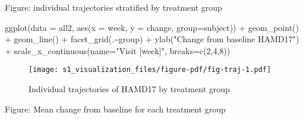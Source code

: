 \documentclass[
  letterpaper,
  DIV=11,
  numbers=noendperiod]{scrreprt}
\newenvironment{Shaded}{\begin{snugshade}}{\end{snugshade}}
\newcommand{\AttributeTok}[1]{\textcolor[rgb]{0.40,0.45,0.13}{#1}}
\newcommand{\DecValTok}[1]{\textcolor[rgb]{0.68,0.00,0.00}{#1}}
\newcommand{\FunctionTok}[1]{\textcolor[rgb]{0.28,0.35,0.67}{#1}}
\newcommand{\NormalTok}[1]{\textcolor[rgb]{0.00,0.23,0.31}{#1}}
\newcommand{\SpecialCharTok}[1]{\textcolor[rgb]{0.37,0.37,0.37}{#1}}
\newcommand{\StringTok}[1]{\textcolor[rgb]{0.13,0.47,0.30}{#1}}
\begin{document}
Figure: individual trajectories stratified by treatment group

\begin{Shaded}
\begin{Highlighting}[]
\FunctionTok{ggplot}\NormalTok{(}\AttributeTok{data =}\NormalTok{ all2, }\FunctionTok{aes}\NormalTok{(}\AttributeTok{x =}\NormalTok{ week, }\AttributeTok{y =}\NormalTok{ change, }\AttributeTok{group=}\NormalTok{subject)) }\SpecialCharTok{+}
  \FunctionTok{geom\_point}\NormalTok{() }\SpecialCharTok{+} \FunctionTok{geom\_line}\NormalTok{() }\SpecialCharTok{+} \FunctionTok{facet\_grid}\NormalTok{(.}\SpecialCharTok{\textasciitilde{}}\NormalTok{group) }\SpecialCharTok{+} \FunctionTok{ylab}\NormalTok{(}\StringTok{"Change from baseline HAMD17"}\NormalTok{) }\SpecialCharTok{+}
  \FunctionTok{scale\_x\_continuous}\NormalTok{(}\AttributeTok{name=}\StringTok{"Visit [week]"}\NormalTok{, }\AttributeTok{breaks=}\FunctionTok{c}\NormalTok{(}\DecValTok{2}\NormalTok{,}\DecValTok{4}\NormalTok{,}\DecValTok{8}\NormalTok{))}
\end{Highlighting}
\end{Shaded}

\begin{figure}[H]

{\centering \texttt{[image: s1\_visualization\_files/figure-pdf/fig-traj-1.pdf]}

}

\caption{\label{fig-traj}Individual trajectories of HAMD17 by treatment
group}

\end{figure}

Figure: Mean change from baseline for each treatment group
\end{document}
